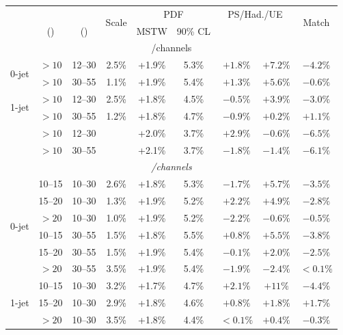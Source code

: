 \begin{table}
	\centering
	\begin{tabular}{ccc|cccccc}
		& \ptsubleadlep & \mll & \multirow{2}{*}{Scale} & \multicolumn{2}{c}{PDF} & \multicolumn{2}{c}{PS/Had./UE} & \multirow{2}{*}{Match} \\
		& (\GeV) & (\GeV) & & MSTW & 90\% CL & \pythia{6} & \fherwig & \\
		\hline
		\multicolumn{9}{c}{\ee/\mm channels} \\
		\hline
		\multirow{2}{*}{0-jet}
		&   $>10$ & 12--30 & 2.5\% & +1.9\% & 5.3\% & $+1.8\%$ & $+7.2\%$ & $-4.2\%$ \\
		&   $>10$ & 30--55 & 1.1\% & +1.9\% & 5.4\% & $+1.3\%$ & $+5.6\%$ & $-0.6\%$ \\
		\hline
		\multirow{2}{*}{1-jet}
		&   $>10$ & 12--30 & 2.5\% & +1.8\% & 4.5\% & $-0.5\%$ & $+3.9\%$ & $-3.0\%$ \\
		&   $>10$ & 30--55 & 1.2\% & +1.8\% & 4.7\% & $-0.9\%$ & $+0.2\%$ & $+1.1\%$ \\
		\hline
		\multirow{2}{*}{\twojet}
		&   $>10$ & 12--30 &       & +2.0\% & 3.7\% & $+2.9\%$ & $-0.6\%$ & $-6.5\%$ \\
		&   $>10$ & 30--55 &       & +2.1\% & 3.7\% & $-1.8\%$ & $-1.4\%$ & $-6.1\%$ \\
		\hline
		\multicolumn{9}{c}{\em/\me channels} \\
		\hline
		\multirow{6}{*}{0-jet}
	    & 10--15 & 10--30 & 2.6\% & +1.8\% & 5.3\% & $-1.7\%$ & $+5.7\%$ & $-3.5\%$ \\
		& 15--20 & 10--30 & 1.3\% & +1.9\% & 5.2\% & $+2.2\%$ & $+4.9\%$ & $-2.8\%$ \\
		&  $>20$ & 10--30 & 1.0\% & +1.9\% & 5.2\% & $-2.2\%$ & $-0.6\%$ & $-0.5\%$ \\
		& 10--15 & 30--55 & 1.5\% & +1.8\% & 5.5\% & $+0.8\%$ & $+5.5\%$ & $-3.8\%$ \\
		& 15--20 & 30--55 & 1.5\% & +1.9\% & 5.4\% & $-0.1\%$ & $+2.0\%$ & $-2.5\%$ \\
		&  $>20$ & 30--55 & 3.5\% & +1.9\% & 5.4\% & $-1.9\%$ & $-2.4\%$ & $<0.1\%$ \\
		\hline
		\multirow{6}{*}{1-jet}
	    & 10--15 & 10--30 & 3.2\% & +1.7\% & 4.7\% & $+2.1\%$ & $+11\%$  & $-4.4\%$ \\
		& 15--20 & 10--30 & 2.9\% & +1.8\% & 4.6\% & $+0.8\%$ & $+1.8\%$ & $+1.7\%$ \\
		&  $>20$ & 10--30 & 3.5\% & +1.8\% & 4.4\% & $<0.1\%$ & $+0.4\%$ & $-0.3\%$ \\

\end{tabular}
\end{table}
